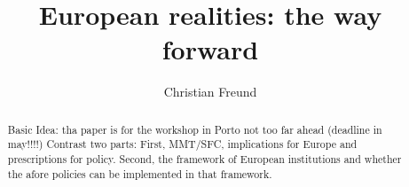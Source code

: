 \documentclass[a4paper,10pt]{article}
\title{European realities: the way forward}
\author{Christian Freund}
\begin{document}
\maketitle

\begin{abstract}
Basic Idea: tha paper is for the workshop in Porto not too far ahead (deadline in may!!!!)
Contrast two parts:
First, MMT/SFC, implications for Europe and prescriptions for policy.
Second, the framework of European institutions and whether the afore policies can be implemented in that framework.
\end{abstract}

\section{}
\end{document}
